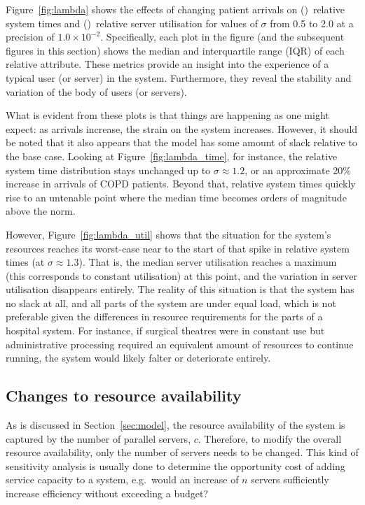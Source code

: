 Figure~\ref{fig:lambda} shows the effects of changing patient arrivals on
()~relative system times and
()~relative server utilisation for values of \(\sigma\)
from 0.5 to 2.0 at a precision of \(1.0 \times 10^{-2}\). Specifically, each
plot in the figure (and the subsequent figures in this section) shows the median
and interquartile range (IQR) of each relative attribute. These metrics provide
an insight into the experience of a typical user (or server) in the system.
Furthermore, they reveal the stability and variation of the body of users
(or servers).

What is evident from these plots is that things are happening as one might
expect: as arrivals increase, the strain on the system increases. However, it
should be noted that it also appears that the model has some amount of slack
relative to the base case. Looking at Figure~\ref{fig:lambda_time}, for
instance, the relative system time distribution stays unchanged up to \(\sigma
\approx 1.2\), or an approximate 20\% increase in arrivals of COPD patients.
Beyond that, relative system times quickly rise to an untenable point where the
median time becomes orders of magnitude above the norm.

However, Figure~\ref{fig:lambda_util} shows that the situation for the system's
resources reaches its worst-case near to the start of that spike in relative
system times (at \(\sigma \approx 1.3\)). That is, the median server utilisation
reaches a maximum (this corresponds to constant utilisation) at this point, and
the variation in server utilisation disappears entirely. The reality of this
situation is that the system has no slack at all, and all parts of the system
are under equal load, which is not preferable given the differences in resource
requirements for the parts of a hospital system. For instance, if surgical
theatres were in constant use but administrative processing required an
equivalent amount of resources to continue running, the system would likely
falter or deteriorate entirely.


\subsection{Changes to resource availability}\label{subsec:resources}

As is discussed in Section~\ref{sec:model}, the resource availability of the
system is captured by the number of parallel servers, \(c\). Therefore, to
modify the overall resource availability, only the number of servers needs to be
changed. This kind of sensitivity analysis is usually done to determine the
opportunity cost of adding service capacity to a system, e.g.\ would an increase
of \(n\) servers sufficiently increase efficiency without exceeding a budget?

